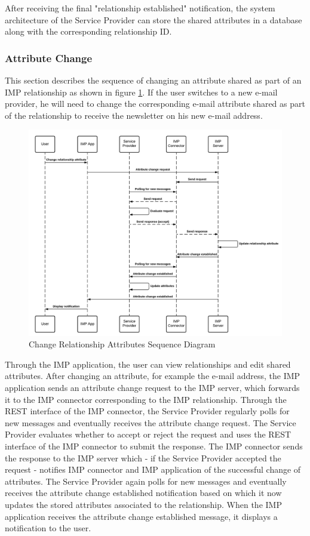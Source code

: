 After receiving the final "relationship established" notification, the system architecture of the Service Provider can store the shared attributes in a database along with the corresponding relationship ID.

\subsubsection{Attribute Change}
This section describes the sequence of changing an attribute shared as part of an IMP relationship as shown in figure \ref{imp:attribute_change}. If the user switches to a new e-mail provider, he will need to change the corresponding e-mail attribute shared as part of the relationship to receive the newsletter on his new e-mail address.

\begin{figure}[H]
    \centering
    \includegraphics[scale=0.6]{Diagrams/IMP Use Case Change Realtionship Attribute Sequence Diagram.pdf}
    \caption{Change Relationship Attributes Sequence Diagram}
    \label{imp:attribute_change}
\end{figure}

Through the IMP application, the user can view relationships and edit shared attributes. After changing an attribute, for example the e-mail address, the IMP application sends an attribute change request to the IMP server, which forwards it to the IMP connector corresponding to the IMP relationship. Through the REST interface of the IMP connector, the Service Provider regularly polls for new messages and eventually receives the attribute change request. The Service Provider evaluates whether to accept or reject the request and uses the REST interface of the IMP connector to submit the response. The IMP connector sends the response to the IMP server which - if the Service Provider accepted the request - notifies IMP connector and IMP application of the successful change of attributes. The Service Provider again polls for new messages and eventually receives the attribute change established notification based on which it now updates the stored attributes associated to the relationship. When the IMP application receives the attribute change established message, it displays a notification to the user.

